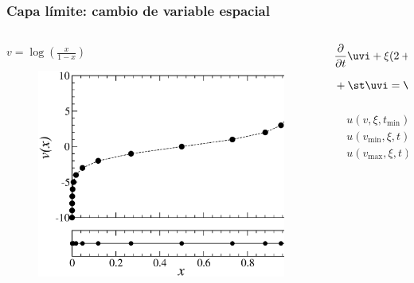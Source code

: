 
\begin{frame}
\frametitle{Capa límite: cambio de variable espacial}
\begin{columns}[c]

\begin{column}{0.55\textwidth}
$v=\log(\frac{x}{1-x})$

\begin{figure}
  \includegraphics[width=1.0\textwidth]{figuras/puntos.eps}
\end{figure}

\end{column}

\begin{column}{0.45\textwidth}
\scriptsize
\begin{equation*}
\begin{split}
&\frac{\partial}{\partial t}\uvi+\xi(2+2\cosh(v)) \frac{\partial}{\partial v}\uvi\\
&+\st\uvi=\sct \int_{-1}^{1} \uvp d\xi'+q, \\
\end{split}
\end{equation*}

\vspace{0.025\textheight}
\begin{equation*}
\begin{split}
&u(v,\xi,t_{\text{min}})=0,\\
&u(v_{\text{min}},\xi,t)=u_{0}(x'_{\text{min}},\xi,t) \; \forall \xi>0,\\
&u(v_{\text{max}},\xi,t)=u_{0}(x'_{\text{max}},\xi,t) \; \forall \xi<0.
\end{split}
\end{equation*}
\end{column}
\end{columns}

\end{frame}


